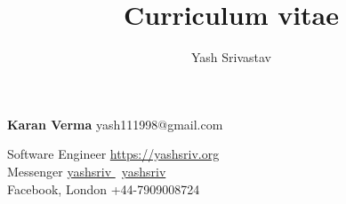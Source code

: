 \documentclass[9pt]{extarticle}
\title{Curriculum vitae}
\author{Yash Srivastav}
\begin{document}

\begingroup
{}

\begin{minipage}[t]{\textwidth}
{\Huge\textbf{\sc Karan Verma}}
\hfill
yash111998@gmail.com \faEnvelope


Software Engineer
\hfill
\href{https://yashsriv.org}{https://yashsriv.org \faHome}\\

Messenger
\hfill
\href{https://github.com/yashsriv}{yashsriv \faGithub} \textbar \
\href{https://www.linkedin.com/in/yashsriv/}{yashsriv \faLinkedin} \\

Facebook, London
\hfill
+44-7909008724 \faMobile \\
\end{minipage}
% 
\begin{minipage}[t]{0.49\textwidth}
  \vspace{3mm}
  
  
\end{minipage}
\hfill
\begin{minipage}[t]{0.49\textwidth}
  \vspace{3mm}
  
  
  
\end{minipage}
% 

\endgroup
\end{document}
